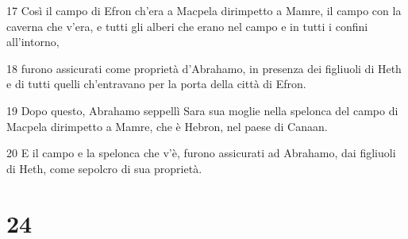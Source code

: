\par 17 Così il campo di Efron ch'era a Macpela dirimpetto a Mamre, il campo con la caverna che v'era, e tutti gli alberi che erano nel campo e in tutti i confini all'intorno,
\par 18 furono assicurati come proprietà d'Abrahamo, in presenza dei figliuoli di Heth e di tutti quelli ch'entravano per la porta della città di Efron.
\par 19 Dopo questo, Abrahamo seppellì Sara sua moglie nella spelonca del campo di Macpela dirimpetto a Mamre, che è Hebron, nel paese di Canaan.
\par 20 E il campo e la spelonca che v'è, furono assicurati ad Abrahamo, dai figliuoli di Heth, come sepolcro di sua proprietà.

\chapter{24}

